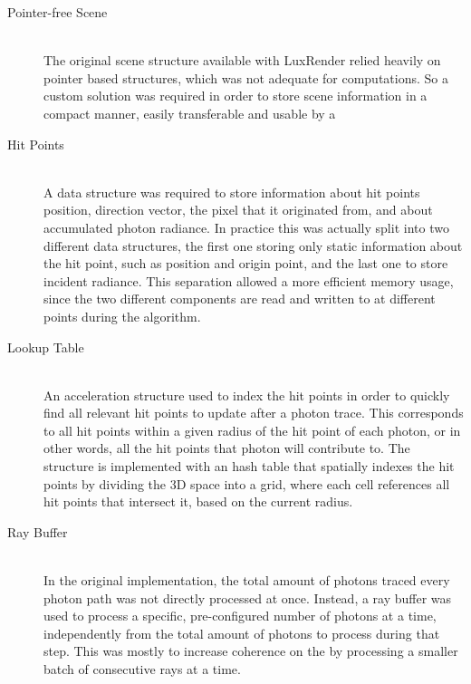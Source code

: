 \documentclass[main.tex]{subfiles}
\begin{document}
\begin{description}
\item[Pointer-free Scene] \hfill \\
  The original scene structure available with LuxRender relied heavily on pointer based structures, which was not adequate for \gpu computations. So a custom solution was required in order to store scene information in a compact manner, easily transferable and usable by a \gpu

\item[Hit Points] \hfill \\
  A data structure was required to store information about hit points position, direction vector, the pixel that it originated from, and about accumulated photon radiance. In practice this was actually split into two different data structures, the first one storing only static information about the hit point, such as position and origin point, and the last one to store incident radiance. This separation allowed a more efficient memory usage, since the two different components are read and written to at different points during the algorithm.

\item[Lookup Table] \hfill \\
  An acceleration structure used to index the hit points in order to quickly find all relevant hit points to update after a photon trace. This corresponds to all hit points within a given radius of the hit point of each photon, or in other words, all the hit points that photon will contribute to. The structure is implemented with an hash table that spatially indexes the hit points by dividing the 3D space into a grid, where each cell references all hit points that intersect it, based on the current radius.

\item[Ray Buffer] \hfill \\
  In the original implementation, the total amount of photons traced every photon path was not directly processed at once. Instead, a ray buffer was used to process a specific, pre-configured number of photons at a time, independently from the total amount of photons to process during that step. This was mostly to increase coherence on the \cpu by processing a smaller batch of consecutive rays at a time.

\end{description}
\end{document}
